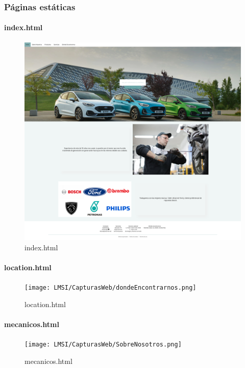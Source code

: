 \documentclass{article}
\begin{document}
\subsubsection{Páginas estáticas}
\paragraph{index.html}
\begin{figure}[H]
  \centering
  \includegraphics[width=1.0\textwidth]{LMSI/CapturasWeb/index.png}
  \caption{index.html}
\end{figure}
\paragraph{location.html}
\begin{figure}[H]
  \centering
  \texttt{[image: LMSI/CapturasWeb/dondeEncontrarnos.png]}
  \caption{location.html}
\end{figure}
\paragraph{mecanicos.html}
\begin{figure}[H]
  \centering
  \texttt{[image: LMSI/CapturasWeb/SobreNosotros.png]}
  \caption{mecanicos.html}
\end{figure}
\end{document}
